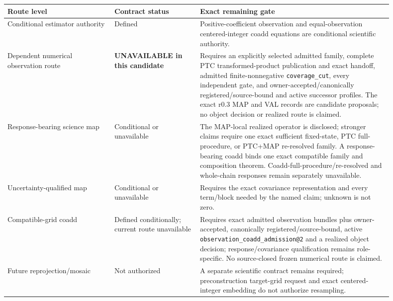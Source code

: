 \documentclass[10pt]{article}
\newcommand{\code}[1]{\nolinkurl{#1}}
\begin{document}
\begin{longtable}{L{0.25\linewidth}L{0.20\linewidth}L{0.45\linewidth}}
\toprule
Route level & Contract status & Exact remaining gate\\
\midrule
Conditional estimator authority & Defined & Positive-coefficient observation and equal-observation centered-integer coadd equations are conditional scientific authority.\\
Dependent numerical observation route & \textbf{UNAVAILABLE in this candidate} & Requires an explicitly selected admitted family, complete PTC transformed-product publication and exact handoff, admitted finite-nonnegative \code{coverage\_cut}, every independent gate, and owner-accepted/canonically registered/source-bound and active successor profiles. The exact r0.3 MAP and VAL records are candidate proposals; no object decision or realized route is claimed.\\
Response-bearing science map & Conditional or unavailable & The MAP-local realized operator is disclosed; stronger claims require one exact sufficient fixed-state, PTC full-procedure, or PTC+MAP re-resolved family. A response-bearing coadd binds one exact compatible family and composition theorem. Coadd-full-procedure/re-resolved and whole-chain responses remain separately unavailable.\\
Uncertainty-qualified map & Conditional or unavailable & Requires the exact covariance representation and every term/block needed by the named claim; unknown is not zero.\\
Compatible-grid coadd & Defined conditionally; current route unavailable & Requires exact admitted observation bundles plus owner-accepted, canonically registered/source-bound, active \code{observation\_coadd\_admission@2} and a realized object decision; response/covariance qualification remains role-specific. No source-closed frozen numerical route is claimed.\\
Future reprojection/mosaic & Not authorized & A separate scientific contract remains required; preconstruction target-grid request and exact centered-integer embedding do not authorize resampling.\\
\bottomrule
\end{longtable}
\end{document}

